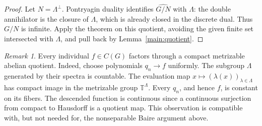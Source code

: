 \documentclass[11pt]{amsart}
\theoremstyle{definition}
\theoremstyle{remark}
\newtheorem{remark}[theorem]{Remark}
\begin{document}
\begin{proof}
Let \(N=\Lambda^\perp\). Pontryagin duality identifies
\(\widehat{G/N}\) with \(\Lambda\): the double annihilator is
the closure of \(\Lambda\), which is already closed in the
discrete dual. Thus \(G/N\) is infinite. Apply the theorem on
this quotient, avoiding the given finite set intersected with
\(\Lambda\), and pull back by Lemma~\ref{main:quotient}.
\end{proof}

\begin{remark}
Every individual \(f\in C(G)\) factors through a compact metrizable
abelian quotient. Indeed, choose polynomials \(q_n\to f\) uniformly.
The subgroup \(\Lambda\) generated by their spectra is countable.
The evaluation map \(x\mapsto(\lambda(x))_{\lambda\in\Lambda}\)
has compact image in the metrizable group \(\mathbb T^\Lambda\).
Every \(q_n\), and hence \(f\), is constant on its fibers.
The descended function is continuous since a continuous surjection
from compact to Hausdorff is a quotient map.
This observation is compatible with, but not needed for, the
nonseparable Baire argument above.
\end{remark}
\end{document}
